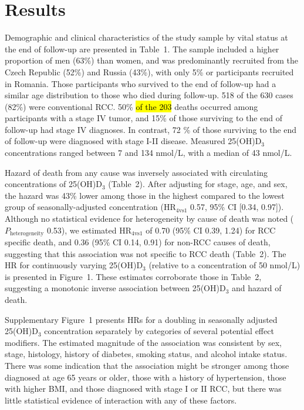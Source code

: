 \documentclass[a4paper,11pt]{article}
\begin{document}
\section*{Results}
Demographic and clinical characteristics of the study sample by vital status at 
the end of follow-up are presented in Table~1. The sample included a higher 
proportion of men (63\%) than women, and was predominantly recruited from the 
Czech Republic (52\%) and Russia (43\%), with only 5\% or participants 
recruited in Romania. Those participants who survived to the end of follow-up 
had a similar age distribution to those who died during follow-up. 518 
of the 630 cases (82\%) were conventional RCC. 50\% \hl{of the 203} deaths occurred 
among participants with a stage IV tumor, and 15\% of those surviving to the end of 
follow-up had stage IV diagnoses. In contrast, 72 \% of those surviving to the 
end of follow-up were diagnosed with stage I-II disease. Measured 25(OH)D$_3$ 
concentrations ranged between 7 and 134 nmol/L, with a median of 43 nmol/L.

Hazard of death from any cause was inversely associated with 
circulating concentrations of 25(OH)D$_3$ (Table~2). After adjusting for 
stage, age, and sex, the hazard was 43\% lower among those in the highest 
compared to the lowest group of seasonally-adjusted concentration 
(HR$_{4\text{vs}1}$ 0.57, 95\% CI [0.34, 0.97]). Although no statistical 
evidence for heterogeneity by cause of death was noted 
($P_\text{heterogeneity}$ 0.53), we estimated HR$_{4\text{vs}1}$ of 0.70 
(95\% CI 0.39, 1.24) for RCC specific death, and 0.36 (95\% CI 0.14, 0.91) for 
non-RCC causes of death, suggesting that this association was not specific to 
RCC death (Table~2). The HR for continuously varying 25(OH)D$_3$ (relative to a 
concentration of 50 nmol/L) is presented in Figure~1. These estimates 
corroborate those in Table~2, suggesting a monotonic inverse association between 
25(OH)D$_3$ and hazard of death.

Supplementary Figure~1 presents HRs for a doubling in seasonally adjusted 
25(OH)D$_3$ concentration separately by categories of several potential effect 
modifiers. The estimated magnitude of the association was consistent by sex, stage, 
histology, history of diabetes, smoking status, and alcohol intake status. 
There was some indication that the association might be stronger among those 
diagnosed at age 65 years or older, those with a history of hypertension, those 
with higher BMI, and those diagnosed with stage I or II RCC, but there was 
little statistical evidence of interaction with any of these factors. 
\end{document}
